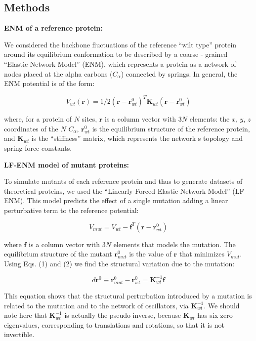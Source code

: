 \documentclass{article}
\begin{document}
\begin{multicols}{2}
\section{Methods}

{\bf ENM of a reference protein:} 

We considered the backbone fluctuations of the reference ``wilt type'' protein around its equilibrium conformation to be described by a coarse - grained ``Elastic Network Model'' (ENM), which represents a protein as a network of nodes placed at the alpha carbons ($C_{\alpha}$) connected by springs. In general, the ENM potential is of the form: 

\begin{equation}
V_{wt}(\mathbf{r}) = 1/2(\mathbf{r}-\mathbf{r}^{0}_{wt})^{T}\mathbf{K}_{wt}(\mathbf{r}-\mathbf{r}^{0}_{wt})
\end{equation}

where, for a protein of $N$ sites, $\mathbf{r}$ is a column vector with $3N$ elements: the $x$, $y$, $z$ coordinates of the $N$ $C_{\alpha}$, $\mathbf{r}^{0}_{wt}$ is the equilibrium structure of the reference protein, and $\mathbf{K}_{wt}$ is the ``stiffness'' matrix, which represents the network\textsc{} s topology and spring force constants.  

{\bf LF-ENM model of mutant proteins:}

To simulate mutants of each reference protein and thus to generate datasets of theoretical proteins, we used the ``Linearly Forced Elastic Network Model'' (LF - ENM). This model predicts the effect of a single mutation adding a linear perturbative term to the reference potential:

\begin{equation}
V_{mut}=V_{wt} - \mathbf{f}^{T}(\mathbf{r}-\mathbf{r}^{0}_{wt})
\end{equation}

where $\mathbf{f}$ is a column vector with $3N$ elements that models the mutation. The equilibrium structure of the mutant $\mathbf{r}^{0}_{mut}$ is the value of $\mathbf{r}$ that minimizes $V_{mut}$. Using Eqs. (1) and (2) we find the structural variation due to the mutation:

\begin{equation}
d\mathbf{r}^{0} \equiv  \mathbf{r}^{0}_{mut} - \mathbf{r}^{0}_{wt} = \mathbf{K}^{-1}_{wt}\mathbf{f}
\end{equation}

This equation shows that the structural perturbation introduced by a mutation is related to the mutation and to the network of oscillators, via $\mathbf{K}^{-1}_{wt}$. We should note here that $\mathbf{K}^{-1}_{wt}$ is actually the pseudo inverse, because $\mathbf{K}_{wt}$ has six zero eigenvalues, corresponding to translations and rotations, so that it is not invertible.


\end{multicols}
\end{document}
